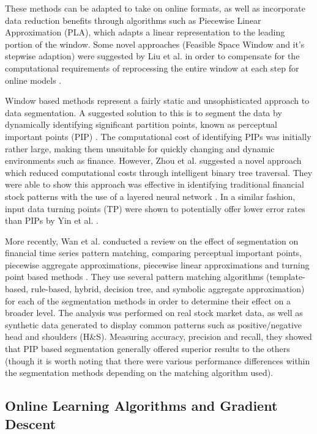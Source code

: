\documentclass[a4paper,11pt,oneside]{article}
\theoremstyle{plain}
\theoremstyle{definition}
\begin{document}
These methods can be adapted to take on online formats, as well as incorporate data reduction benefits 
through algorithms such as Piecewise Linear Approximation (PLA), which adapts a linear representation to the 
leading portion of the window. Some novel approaches (Feasible Space Window and it’s stepwise adaption) were 
suggested by Liu et al. in order to compensate for the computational requirements of reprocessing the entire 
window at each step for online models \cite{Liu}.
\hfill \break 

Window based methods represent a fairly static and unsophisticated approach to data segmentation. 
A suggested solution to this is to segment the data by dynamically identifying significant partition points, 
known as perceptual important points (PIP) \cite{Chung}. The computational cost of identifying PIPs was initially 
rather large, making them unsuitable for quickly changing and dynamic environments such as finance. 
However, Zhou et al. suggested a novel approach which reduced computational costs through intelligent binary 
tree traversal. They were able to show this approach was effective in identifying traditional financial stock patterns 
with the use of a layered neural network \cite{Zhou}. In a similar fashion, input data turning points (TP) were shown to 
potentially offer lower error rates than PIPs by Yin et al. \cite{Yin}.
\hfill \break 

More recently, Wan et al. conducted a review on the effect of segmentation on financial time series pattern 
matching, comparing perceptual important points, piecewise aggregate approximations, piecewise linear 
approximations and turning point based methods \cite{Wan}. They use several pattern matching algorithms 
(template-based, rule-based, hybrid, decision tree, and symbolic aggregate approximation) for each of the 
segmentation methods in order to determine their effect on a broader level. The analysis was performed on real 
stock market data, as well as synthetic data generated to display common patterns such as positive/negative 
head and shoulders (H\&S). Measuring accuracy, precision and recall, they showed that PIP based segmentation 
generally offered superior results to the others (though it is worth noting that there were various performance 
differences within the segmentation methods depending on the matching algorithm used).

\subsection{Online Learning Algorithms and Gradient Descent} \label{lr_OGD}
\hfill
\end{document}
